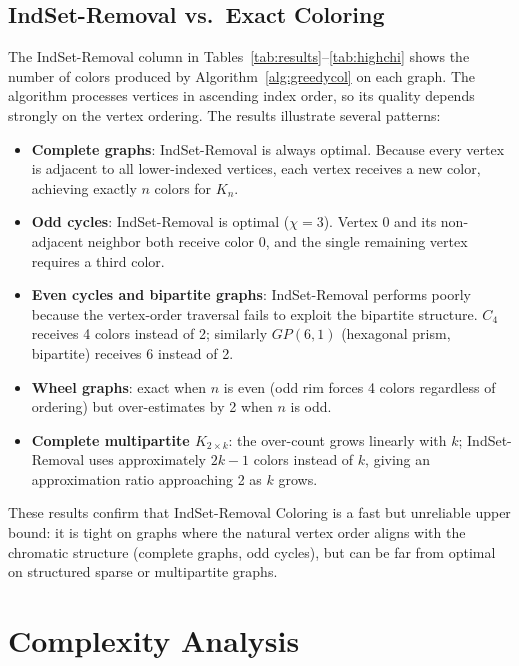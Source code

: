 \documentclass[11pt]{article}
\begin{document}
\subsection{IndSet-Removal vs.\ Exact Coloring}\label{sec:greedy_vs_exact}

The IndSet-Removal column in Tables~\ref{tab:results}--\ref{tab:highchi} shows
the number of colors produced by Algorithm~\ref{alg:greedycol} on each graph.
The algorithm processes vertices in ascending index order, so its quality
depends strongly on the vertex ordering.  The results illustrate several
patterns:

\begin{itemize}
\item \textbf{Complete graphs}: IndSet-Removal is always optimal.  Because every
  vertex is adjacent to all lower-indexed vertices, each vertex receives a new
  color, achieving exactly $n$ colors for $K_n$.

\item \textbf{Odd cycles}: IndSet-Removal is optimal ($\chi = 3$).  Vertex 0 and
  its non-adjacent neighbor both receive color 0, and the single remaining
  vertex requires a third color.

\item \textbf{Even cycles and bipartite graphs}: IndSet-Removal performs poorly
  because the vertex-order traversal fails to exploit the bipartite structure.
  $C_4$ receives 4 colors instead of 2; similarly $GP(6,1)$ (hexagonal prism,
  bipartite) receives 6 instead of 2.

\item \textbf{Wheel graphs}: exact when $n$ is even (odd rim forces 4 colors
  regardless of ordering) but over-estimates by 2 when $n$ is odd.

\item \textbf{Complete multipartite $K_{2\times k}$}: the over-count grows
  linearly with $k$; IndSet-Removal uses approximately $2k-1$ colors instead of
  $k$, giving an approximation ratio approaching 2 as $k$ grows.
\end{itemize}

These results confirm that IndSet-Removal Coloring is a fast but unreliable upper
bound: it is tight on graphs where the natural vertex order aligns with the
chromatic structure (complete graphs, odd cycles), but can be far from optimal
on structured sparse or multipartite graphs.

\section{Complexity Analysis}\label{sec:complexity}
\end{document}
